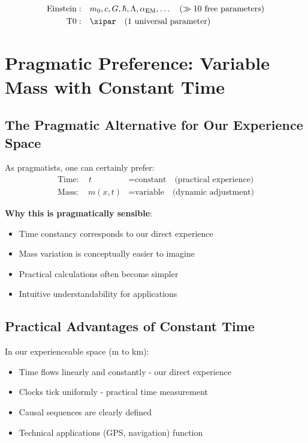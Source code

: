 	\begin{align}
		\text{Einstein}: \quad &m_0, c, G, \hbar, \Lambda, \alpha_{\text{EM}}, \ldots \quad (\gg 10 \text{ free parameters}) \\
		\text{T0}: \quad &\xipar \quad (1 \text{ universal parameter})
	\end{align}
	
	\section{Pragmatic Preference: Variable Mass with Constant Time}
	
	\subsection{The Pragmatic Alternative for Our Experience Space}
	
	As pragmatists, one can certainly prefer:
	\begin{align}
		\text{Time}: \quad t &= \text{constant} \quad \text{(practical experience)} \\
		\text{Mass}: \quad m(x,t) &= \text{variable} \quad \text{(dynamic adjustment)}
	\end{align}
	
	\textbf{Why this is pragmatically sensible}:
	\begin{itemize}
		\item Time constancy corresponds to our direct experience
		\item Mass variation is conceptually easier to imagine
		\item Practical calculations often become simpler
		\item Intuitive understandability for applications
	\end{itemize}
	
	\subsection{Practical Advantages of Constant Time}
	
	In our experienceable space (m to km):
	\begin{itemize}
		\item Time flows linearly and constantly - our direct experience
		\item Clocks tick uniformly - practical time measurement
		\item Causal sequences are clearly defined
		\item Technical applications (GPS, navigation) function
	\end{itemize}
	
